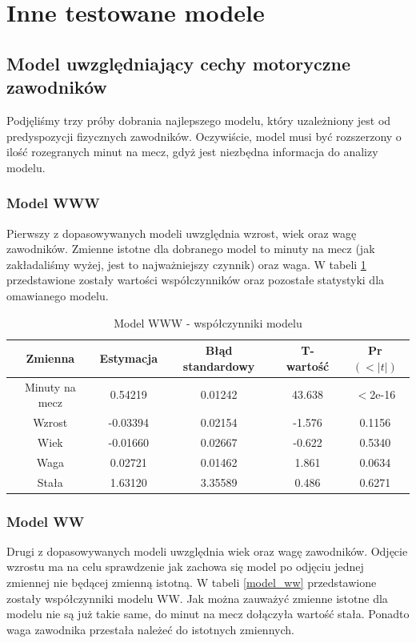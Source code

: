 \documentclass[11pt,a4paper]{article}
\begin{document}
\section{Inne testowane modele}
\subsection{Model uwzględniający cechy motoryczne zawodników}
Podjęliśmy trzy próby dobrania najlepszego modelu, który uzależniony jest od predyspozycji fizycznych zawodników. Oczywiście, model musi być rozszerzony o ilość rozegranych minut na mecz, gdyż jest niezbędna informacja do analizy modelu.

\subsubsection{Model WWW}
Pierwszy z dopasowywanych modeli uwzględnia wzrost, wiek oraz wagę zawodników. Zmienne istotne dla dobranego model to minuty na mecz (jak zakładaliśmy wyżej, jest to najważniejszy czynnik) oraz waga. W tabeli \ref{model_www} przedstawione zostały wartości współczynników oraz pozostałe statystyki dla omawianego modelu. 

\begin{table}[H]
	\begin{tabular}{| c | c | c | c | c |}
		\hline
		Zmienna & Estymacja & Błąd standardowy & T-wartość & Pr$(<|t|)$\\ \hline
		Minuty na mecz & 0.54219 & 0.01242 & 43.638 & $<$2e-16\\ \hline
		Wzrost & -0.03394 & 0.02154 & -1.576 & 0.1156\\ \hline
		Wiek & -0.01660 & 0.02667 & -0.622 & 0.5340\\ \hline 
		Waga & 0.02721 & 0.01462 & 1.861 & 0.0634\\ \hline
		Stała & 1.63120 & 3.35589 & 0.486 & 0.6271 \\ \hline
	\end{tabular}
	\caption{Model WWW - współczynniki modelu}
	\label{model_www}
\end{table}

\subsubsection{Model WW}
Drugi z dopasowywanych modeli uwzględnia wiek oraz wagę zawodników. Odjęcie wzrostu ma na celu sprawdzenie jak zachowa się model po odjęciu jednej zmiennej nie będącej zmienną istotną. W tabeli \ref{model_ww} przedstawione zostały współczynniki modelu WW. Jak można zauważyć zmienne istotne dla modelu nie są już takie same, do minut na mecz dołączyła wartość stała. Ponadto waga zawodnika przestała należeć do istotnych zmiennych.
\end{document}
